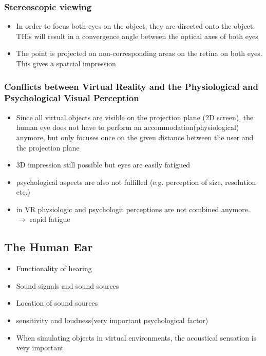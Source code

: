 \documentclass{standalone}
\begin{document}
\subsubsection*{Stereoscopic viewing}
\begin{itemize}
	\item In order to focus both eyes on the object, they are directed onto the object. THis will result in a convergence angle between the optical axes of both eyes	
	\item The point is projected on non-corresponding areas on the retina on both eyes. This gives a spatcial impression
\end{itemize}
\subsubsection{Conflicts between Virtual Reality and the Physiological and Psychological Visual Perception}
\begin{itemize}
	\item Since all virtual objects are visible on the projection plane (2D screen), the human eye does not have to perform an accommodation(physiological) anymore, but only focuses once on the given distance between the user and the projection plane
	\item 3D impression still possible but eyes are easily fatigued
	\item psychological aspects are also not fulfilled (e.g. perception of size, resolution etc.)
	\item in VR physiologic and psychologit perceptions are not combined anymore. $\rightarrow$ rapid fatigue
\end{itemize}
\subsection{The Human Ear}
\begin{itemize}
	\item Functionality of hearing
	\item Sound signals and sound sources
	\item Location of sound sources
	\item sensitivity and loudness(very important psychological factor)
	\item When simulating objects in virtual environments, the acoustical sensation is very important
\end{itemize}
\end{document}
